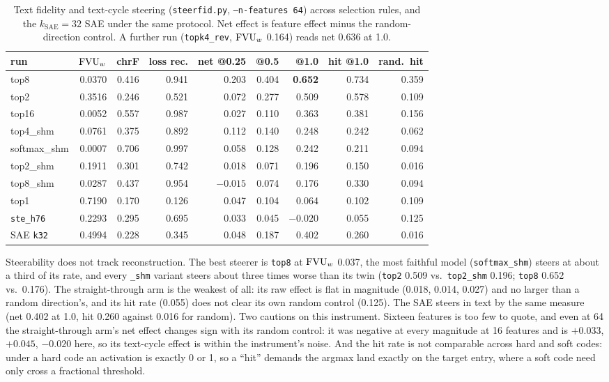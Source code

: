 \begin{table}[htbp]\centering\small\setlength{\tabcolsep}{4pt}
\begin{tabular}{@{}lrrrrrrrr@{}}
\toprule
run & $\mathrm{FVU}_w$ & chrF & loss rec. & net @0.25 & @0.5 & @1.0 & hit @1.0 & rand.\ hit \\
\midrule
top8          & 0.0370 & 0.416 & 0.941 & 0.203 & 0.404 & \textbf{0.652} & 0.734 & 0.359 \\
top2          & 0.3516 & 0.246 & 0.521 & 0.072 & 0.277 & 0.509 & 0.578 & 0.109 \\
top16         & 0.0052 & 0.557 & 0.987 & 0.027 & 0.110 & 0.363 & 0.381 & 0.156 \\
top4\_shm     & 0.0761 & 0.375 & 0.892 & 0.112 & 0.140 & 0.248 & 0.242 & 0.062 \\
softmax\_shm  & 0.0007 & 0.706 & 0.997 & 0.058 & 0.128 & 0.242 & 0.211 & 0.094 \\
top2\_shm     & 0.1911 & 0.301 & 0.742 & 0.018 & 0.071 & 0.196 & 0.150 & 0.016 \\
top8\_shm     & 0.0287 & 0.437 & 0.954 & $-0.015$ & 0.074 & 0.176 & 0.330 & 0.094 \\
top1          & 0.7190 & 0.170 & 0.126 & 0.047 & 0.104 & 0.064 & 0.102 & 0.109 \\
\texttt{ste\_h76} & 0.2293 & 0.295 & 0.695 & 0.033 & 0.045 & $-0.020$ & 0.055 & 0.125 \\
\midrule
SAE \texttt{k32} & 0.4994 & 0.228 & 0.345 & 0.048 & 0.187 & 0.402 & 0.260 & 0.016 \\
\bottomrule
\end{tabular}
\caption{Text fidelity and text-cycle steering (\texttt{steerfid.py},
\texttt{--n-features 64}) across selection rules, and the
$k_{\mathrm{SAE}}{=}32$ SAE under the same protocol. Net effect is feature
effect minus the random-direction control. A further run
(\texttt{topk4\_rev}, $\mathrm{FVU}_w$ 0.164) reads net 0.636 at 1.0.}
\label{tab:steerfid}
\end{table}

Steerability does not track reconstruction. The best steerer is
\texttt{top8} at $\mathrm{FVU}_w$ 0.037, the most faithful model
(\texttt{softmax\_shm}) steers at about a third of its rate, and every
\texttt{\_shm} variant steers about three times worse than its twin
(\texttt{top2} 0.509 vs.\ \texttt{top2\_shm} 0.196; \texttt{top8} 0.652
vs.\ 0.176). The straight-through arm is the weakest of all: its raw
effect is flat in magnitude (0.018, 0.014, 0.027) and no larger than a
random direction's, and its hit rate (0.055) does not clear its own
random control (0.125). The SAE steers in text by the same measure (net
0.402 at 1.0, hit 0.260 against 0.016 for random).
Two cautions on this instrument. Sixteen features is too few to quote,
and even at 64 the straight-through arm's net effect changes sign with
its random control: it was negative at every magnitude at 16 features
and is $+0.033$, $+0.045$, $-0.020$ here, so its text-cycle effect is
within the instrument's noise. And the hit rate is not
comparable across hard and soft codes: under a hard code an activation
is exactly 0 or 1, so a ``hit'' demands the argmax land exactly on the
target entry, where a soft code need only cross a fractional threshold.

